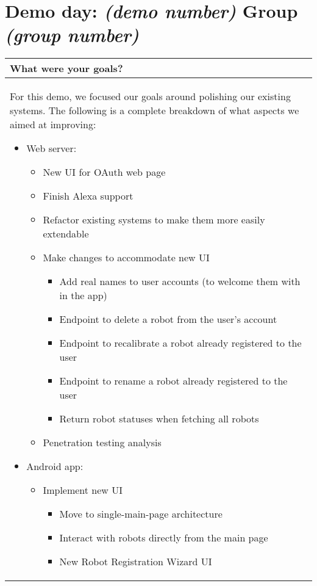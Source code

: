\documentclass[a4paper]{article}
\newcommand{\colWidth}{141mm}
\begin{document}
 
\section*{Demo day: \textit{(demo number)} Group \textit{(group number)}}


\begin{center}
\begin{tabular}{|p{\colWidth}|}
	\hline
	\cellcolor{blue!25}\large
	\textbf{What were your goals?}
	\\ \hline
	
		For this demo, we focused our goals around polishing our existing systems.
		The following is a complete breakdown of what aspects we aimed at improving:
		\begin{itemize}
			\item Web server:
			\begin{itemize}
				\item New UI for OAuth web page
				\item Finish Alexa support
				\item Refactor existing systems to make them more easily extendable
				\item Make changes to accommodate new UI
				\begin{itemize}
					\item Add real names to user accounts (to welcome them with in the app)
					\item Endpoint to delete a robot from the user's account
					\item Endpoint to recalibrate a robot already registered to the user
					\item Endpoint to rename a robot already registered to the user
					\item Return robot statuses when fetching all robots
				\end{itemize}
				\item Penetration testing analysis
			\end{itemize}
			\item Android app:
			\begin{itemize}
				\item Implement new UI
				\begin{itemize}
					\item Move to single-main-page architecture
					\item Interact with robots directly from the main page
					\item New Robot Registration Wizard UI

\end{itemize}
\end{itemize}
\end{itemize}
\end{tabular}
\end{center}
\end{document}
